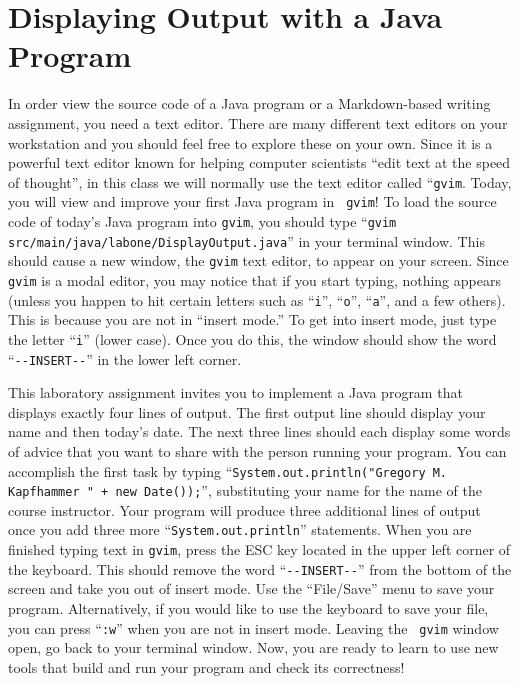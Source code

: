 \documentclass[11pt]{article}
\newcommand{\command}[1]{``\lstinline{#1}''}
\newcommand{\program}[1]{\lstinline{#1}}
\newcommand{\option}[1]{``{#1}''}
\begin{document}
\section*{Displaying Output with a Java Program}

In order view the source code of a Java program or a Markdown-based writing assignment, you need a text editor. There
are many different text editors on your workstation and you should feel free to explore these on your own. Since it is a
powerful text editor known for helping computer scientists ``edit text at the speed of thought'', in this class we will
normally use the text editor called ``{\tt gvim}. Today, you will view and improve your first Java program in {\tt
gvim}! To load the source code of today's Java program into \program{gvim}, you should type \command{gvim
src/main/java/labone/DisplayOutput.java} in your terminal window. This should cause a new window, the \program{gvim}
text editor, to appear on your screen. Since {\tt gvim} is a modal editor, you may notice that if you start typing,
nothing appears (unless you happen to hit certain letters such as \command{i}, \command{o}, \command{a}, and a few
others). This is because you are not in ``insert mode.'' To get into insert mode, just type the letter \command{i}
(lower case). Once you do this, the window should show the word \command{--INSERT--} in the lower left corner.

This laboratory assignment invites you to implement a Java program that displays exactly four lines of output. The first
output line should display your name and then today's date. The next three lines should each display some words of
advice that you want to share with the person running your program. You can accomplish the first task by typing
\command{System.out.println("Gregory M. Kapfhammer " + new Date());}, substituting your name for the name of the course
instructor. Your program will produce three additional lines of output once you add three more
\command{System.out.println} statements. When you are finished typing text in \program{gvim}, press the ESC key located
in the upper left corner of the keyboard. This should remove the word \command{--INSERT--} from the bottom of the screen
and take you out of insert mode. Use the \option{File/Save} menu to save your program. Alternatively, if you would like
to use the keyboard to save your file, you can press \command{:w} when you are not in insert mode. Leaving the {\tt
gvim} window open, go back to your terminal window. Now, you are ready to learn to use new tools that build and run your
program and check its correctness!
\end{document}
